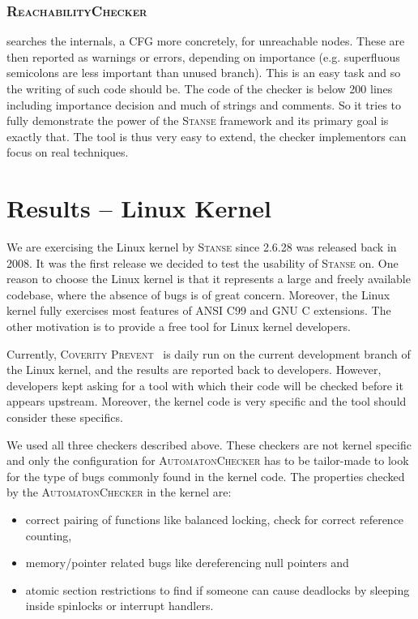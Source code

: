 \documentclass[10pt]{llncs}
\newcommand{\Stanse}{\textsc{Stanse}\xspace}
\newcommand{\AC}{\textsc{AutomatonChecker}\xspace}
\newcommand{\RC}{\textsc{ReachabilityChecker}\xspace}
\begin{document}
\vspace{-.7\baselineskip}
\subsubsection{\RC}
searches the internals, a CFG more concretely, for
unreachable nodes. These are then reported as warnings or errors, depending on
importance (e.g. superfluous semicolons are less important than unused
branch). This is an easy task and so the writing of such code should be. The
code of the checker is below 200 lines including importance decision and much
of strings and comments. So it tries to fully demonstrate the power of the
\Stanse framework and its primary goal is exactly that. The tool is thus very
easy to extend, the checker implementors can focus on real techniques.

\section{Results -- Linux Kernel}
\label{sec:linux}

We are exercising the Linux kernel by \Stanse since 2.6.28 was released back
in 2008. It was the first release we decided to test the usability of \Stanse
on. One reason to choose the Linux kernel is that it represents a large and
freely available codebase, where the absence of bugs is of great concern.
Moreover, the Linux kernel fully exercises most features of ANSI C99 and GNU C
extensions. The other motivation is to provide a free tool for Linux kernel
developers.

Currently, \textsc{Coverity Prevent}~\cite{coverity} is daily run on the
current development branch of the Linux kernel, and the results are reported
back to developers. However, developers kept asking for a tool with which
their code will be checked before it appears upstream. Moreover, the kernel
code is very specific and the tool should consider these specifics.

We used all three checkers described above. These checkers are not kernel
specific and only the configuration for \AC has to be tailor-made to look for
the type of bugs commonly found in the kernel code. The properties checked by
the \AC in the kernel are:
\begin{itemize}
\item correct pairing of functions like balanced locking, check for correct
  reference counting,
\item memory/pointer related bugs like dereferencing null pointers and
\item atomic section restrictions to find if someone can cause deadlocks by
sleeping inside spinlocks or interrupt handlers.
\end{itemize}
\end{document}
